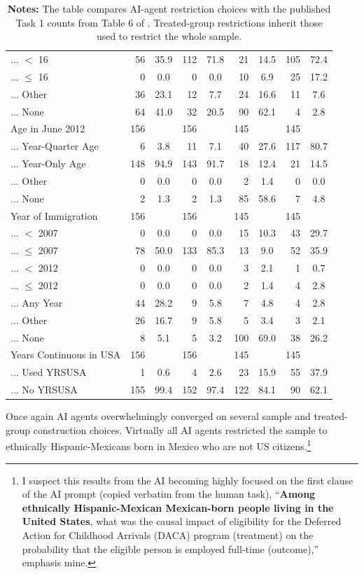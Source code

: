 \documentclass[
  12pt]{article}
\begin{document}
\begin{table}[H]
{\begin{tabular}{lrcrcrcrc}
... $<$ 16 & 56 & 35.9 & 112 & 71.8 & 21 & 14.5 & 105 & 72.4 \\
... $\leq$ 16 & 0 & 0.0 & 0 & 0.0 & 10 & 6.9 & 25 & 17.2 \\
... Other & 36 & 23.1 & 12 & 7.7 & 24 & 16.6 & 11 & 7.6 \\
... None & 64 & 41.0 & 32 & 20.5 & 90 & 62.1 & 4 & 2.8 \\
Age in June 2012 & 156 & & 156 & & 145 & & 145 & \\
... Year-Quarter Age & 6 & 3.8 & 11 & 7.1 & 40 & 27.6 & 117 & 80.7 \\
... Year-Only Age & 148 & 94.9 & 143 & 91.7 & 18 & 12.4 & 21 & 14.5 \\
... Other & 0 & 0.0 & 0 & 0.0 & 2 & 1.4 & 0 & 0.0 \\
... None & 2 & 1.3 & 2 & 1.3 & 85 & 58.6 & 7 & 4.8 \\
Year of Immigration & 156 & & 156 & & 145 & & 145 & \\
... $<$ 2007 & 0 & 0.0 & 0 & 0.0 & 15 & 10.3 & 43 & 29.7 \\
... $\leq$ 2007 & 78 & 50.0 & 133 & 85.3 & 13 & 9.0 & 52 & 35.9 \\
... $<$ 2012 & 0 & 0.0 & 0 & 0.0 & 3 & 2.1 & 1 & 0.7 \\
... $\leq$ 2012 & 0 & 0.0 & 0 & 0.0 & 2 & 1.4 & 4 & 2.8 \\
... Any Year & 44 & 28.2 & 9 & 5.8 & 7 & 4.8 & 4 & 2.8 \\
... Other & 26 & 16.7 & 9 & 5.8 & 5 & 3.4 & 3 & 2.1 \\
... None & 8 & 5.1 & 5 & 3.2 & 100 & 69.0 & 38 & 26.2 \\
Years Continuous in USA & 156 & & 156 & & 145 & & 145 & \\
... Used YRSUSA & 1 & 0.6 & 4 & 2.6 & 23 & 15.9 & 55 & 37.9 \\
... No YRSUSA & 155 & 99.4 & 152 & 97.4 & 122 & 84.1 & 90 & 62.1 \\
\bottomrule
\end{tabular}
}
\caption*{\footnotesize \textbf{Notes:} The table compares AI-agent restriction choices with the published Task 1 counts from Table 6 of \citet{huntingtonklein2025sources}. Treated-group restrictions inherit those used to restrict the whole sample.}
\end{table}
\FloatBarrier

Once again AI agents overwhelmingly converged on several sample and
treated-group construction choices. Virtually all AI agents restricted
the sample to ethnically Hispanic-Mexicans born in Mexico who are not US
citizens.\footnote{I suspect this results from the AI becoming highly focused on the first clause of the AI prompt (copied verbatim from the human task), ``\textbf{Among ethnically Hispanic-Mexican Mexican-born people living in the United States}, what was the causal impact of eligibility for the Deferred Action for Childhood Arrivals (DACA) program (treatment) on the probability that the eligible person is employed full-time (outcome),'' emphasis mine.}
\end{document}
